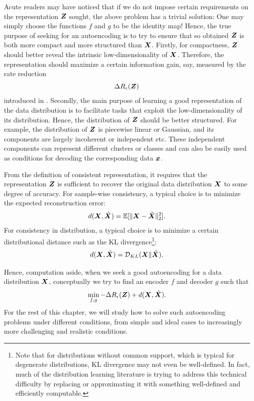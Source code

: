 \documentclass[../../book-main.tex]{subfiles}
\begin{document}
Acute readers may have noticed that if we do not impose certain
requirements on the representation $\bm{Z}$ sought, the above problem has
a trivial solution: One may simply choose the functions $f$ and $g$
to be the identity map! Hence, the true purpose of seeking for an
autoencoding is to try to ensure that so obtained $\bm{Z}$ is both more
compact and more structured than $\bm{X}$. Firstly, for compactness, $\bm{Z}$
should better reveal the intrinsic low-dimensionality of $\bm{X}$.
Therefore, the representation should maximize a certain information
gain, say, measured by the rate reduction
\begin{equation}
  \Delta R_{\epsilon}(\bm{Z})
\end{equation}
introduced in . Secondly, the main purpose of
learning a good representation of the data distribution is to
facilitate tasks that exploit the low-dimensionality of its
distribution. Hence, the distribution of $\bm{Z}$ should be better
structured. For example, the distribution of $\bm{Z}$ is piecewise linear
or Gaussian, and its components are largely incoherent or independent
etc. These independent components can represent different clusters or
classes and can also be easily used as conditions for decoding the
corresponding data $\bm{x}$.

From the definition of consistent representation, it requires that
the representation $\bm{Z}$ is sufficient to recover the original data
distribution $\bm{X}$ to some degree of accuracy. For sample-wise
consistency, a typical choice is to minimize the expected reconstruction error:
\begin{equation}
  d(\bm{X}, \hat {\bm{X}}) = \mathbb{E}[\|\bm{X} - \hat{\bm{X}}\|_2^2].
\end{equation}
For consistency in distribution, a typical choice is to minimize a
certain distributional distance such as the KL
divergence\footnote{Note that for distributions without common
  support, which is typical for degenerate distributions, KL divergence
  may not even be well-defined. In fact, much of the distribution
  learning literature is trying to address this technical difficulty by
  replacing or approximating it with something well-defined and
efficiently computable.}:
\begin{equation}
  d(\bm{X}, \hat {\bm{X}}) = \mathcal{D}_{KL}(\bm{X}\|\hat{\bm{X}}).
\end{equation}

Hence, computation aside, when we seek a good autoencoding for a data
distribution $\bm{X}$,  conceptually we try to find an encoder $f$ and
decoder $g$ such that
\begin{equation}
  \min_{f, g} - \Delta R_{\epsilon}(\bm{Z}) + d(\bm{X}, \hat {\bm{X}}).
  \label{eqn:autoencode-objective-ch5}
\end{equation}
For the rest of this chapter, we will study how to solve such
autoencoding problems under different conditions, from simple and
ideal cases to increasingly more challenging and realistic conditions.
\end{document}
